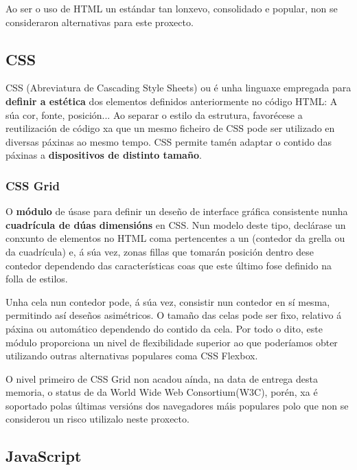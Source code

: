 Ao ser o uso de HTML un estándar tan lonxevo, consolidado e popular, non se consideraron alternativas para este proxecto.


\subsection{CSS}

CSS (Abreviatura de Cascading Style Sheets) ou  é unha linguaxe empregada para \textbf{definir a estética} dos elementos definidos anteriormente no código HTML: A súa cor, fonte, posición... Ao separar o estilo da estrutura, favorécese a reutilización de código xa que un mesmo ficheiro de CSS pode ser utilizado en diversas páxinas ao mesmo tempo. CSS permite tamén adaptar o contido das páxinas a \textbf{dispositivos de distinto tamaño}\cite{css_w3c}.

\subsubsection{CSS Grid}
\label{cssgrid}

O \textbf{módulo} de  úsase para definir un deseño de interface gráfica consistente nunha \textbf{cuadrícula de dúas dimensións} en CSS. Nun modelo deste tipo, declárase un conxunto de elementos no HTML coma pertencentes a un (contedor da grella ou da cuadrícula) e, á súa vez, zonas fillas que tomarán posición dentro dese contedor dependendo das características coas que este último fose definido na folla de estilos.

Unha cela nun contedor pode, á súa vez, consistir nun contedor en sí mesma, permitindo así deseños asimétricos. O tamaño das celas pode ser fixo, relativo á páxina ou automático dependendo do contido da cela. Por todo o dito, este módulo proporciona un nivel de flexibilidade superior ao que poderíamos obter utilizando outras alternativas populares coma CSS Flexbox. 

O nivel primeiro de CSS Grid non acadou aínda, na data de entrega desta memoria, o status de  da  World Wide Web Consortium(W3C)\cite{css_grid_w3c}, porén, xa é soportado polas últimas versións dos navegadores máis populares\cite{css_grid_w3c2} polo que non se considerou un risco utilizalo neste proxecto.

\subsection{JavaScript}

